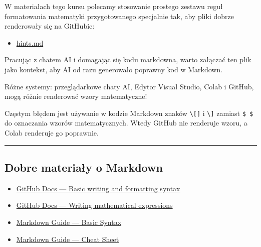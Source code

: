 \documentclass[11pt, a4paper]{article}
\begin{document}
W materiałach tego kursu polecamy stosowanie prostego zestawu reguł formatowania matematyki przygotowanego specjalnie tak, aby pliki dobrze renderowały się na GitHubie:

\begin{itemize}
    \item \href{hints.md}{hints.md}
\end{itemize}

Pracując z chatem AI i domagając się kodu markdowna, warto załączać ten plik jako kontekst, aby AI od razu generowało poprawny kod w Markdown.

Różne systemy: przeglądarkowe chaty AI, Edytor Visual Studio, Colab i GitHub, mogą różnie renderować wzory matematyczne!

Częstym błędem jest używanie w kodzie Markdown znaków \texttt{\textbackslash[]} i \texttt{\textbackslash]} zamiast \texttt{\$ \$} do oznaczania wzorów matematycznych. Wtedy GitHub nie renderuje wzoru, a Colab renderuje go poprawnie.

\medskip\hrule\medskip

\subsection{Dobre materiały o Markdown}

\begin{itemize}
    \item \href{https://docs.github.com/en/get-started/writing-on-github/getting-started-with-writing-and-formatting-on-github/basic-writing-and-formatting-syntax}{GitHub Docs --- Basic writing and formatting syntax}
    \item \href{https://docs.github.com/en/get-started/writing-on-github/working-with-advanced-formatting/writing-mathematical-expressions}{GitHub Docs --- Writing mathematical expressions}
    \item \href{https://www.markdownguide.org/basic-syntax/}{Markdown Guide --- Basic Syntax}
    \item \href{https://www.markdownguide.org/cheat-sheet/}{Markdown Guide --- Cheat Sheet}
\end{itemize}
\end{document}
